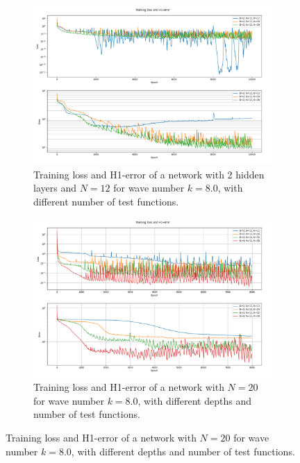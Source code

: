 \begin{figure}[h!]
    \centering
    \begin{subfigure}[b]{0.48\textwidth}
        \includegraphics[width=\textwidth]{img/VPINN-Deep-Comparison-k8increaseK.png}
        \caption{Training loss and H1-error of a network with 2 hidden layers and $N=12$ for wave number $k=8.0$, with different number of test functions.}
        \label{fig:vpinnsdeepincreaseK}
    \end{subfigure}
    \hfill
    \begin{subfigure}[b]{0.48\textwidth}
        \includegraphics[width=\textwidth]{img/VPINN-Deep-Comparison-k8increaseD.png}
        \caption{Training loss and H1-error of a network with $N=20$ for wave number $k=8.0$, with different depths and number of test functions.}
        \label{fig:vpinnsdeepincreaseD}
    \end{subfigure}
\end{figure}

